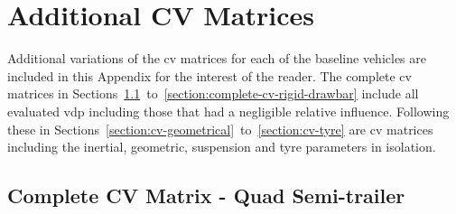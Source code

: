 \chapter{Additional CV Matrices}\label{appendix:complete-cv-matrix}

Additional variations of the \gls{cv} matrices for each of the baseline vehicles are included in this Appendix for the interest of the reader. The complete \gls{cv} matrices in Sections~\ref{section:complete-cv-quad-semi}~to~\ref{section:complete-cv-rigid-drawbar} include all evaluated \gls{vdp} including those that had a negligible relative influence. Following these in Sections~\ref{section:cv-geometrical}~to~\ref{section:cv-tyre} are \gls{cv} matrices including the inertial, geometric, suspension and tyre parameters in isolation.

\section{Complete CV Matrix - Quad Semi-trailer}\label{section:complete-cv-quad-semi}


